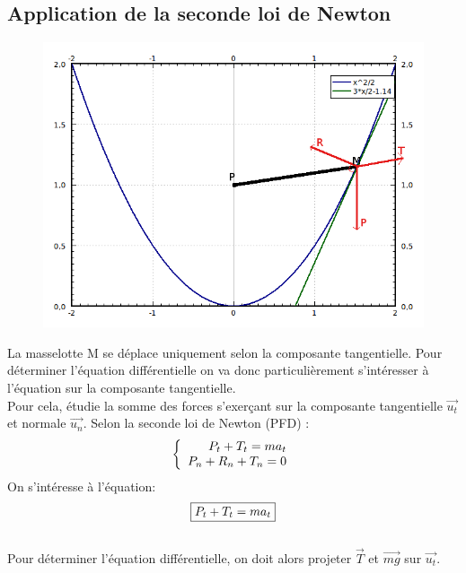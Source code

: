 \documentclass[10pt,a4paper]{article}
\begin{document}
\subsection{Application de la seconde loi de Newton}
\begin{figure}[H]
	\includegraphics[scale=0.7]{GraphMath2.png}
\end{figure}
La masselotte M se déplace uniquement selon la composante tangentielle. Pour déterminer l'équation différentielle on va donc particulièrement s'intéresser à l'équation sur la composante tangentielle.\\
Pour cela, étudie la somme des forces s'exerçant sur la composante tangentielle $\vec{u_t}$ et normale $\vec{u_n}$. Selon la seconde loi de Newton (PFD) :
\[
   \left \{
   \begin{array}{r c l}
      P_t+T_t=ma_t  \\
      P_n+R_n+T_n=0 
   \end{array}
   \right .
\]
On s'intéresse à l'équation: \[\fbox{$P_t+T_t=ma_t$}\] \\ 
Pour déterminer l'équation différentielle, on doit alors projeter $\vec{T}$ et  $\vec{mg}$ sur $\vec{u_t}$. \\
\end{document}
